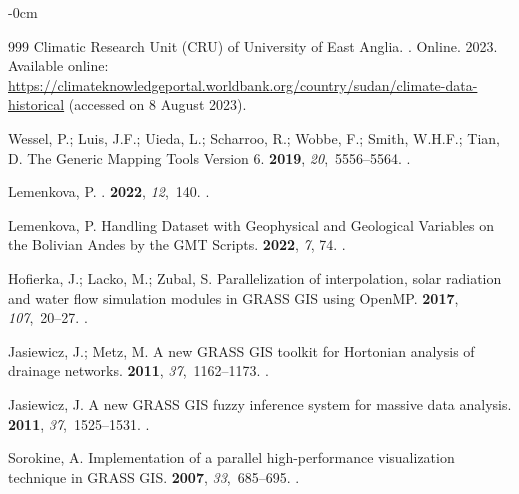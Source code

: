 \documentclass[analytics,article,accept,pdftex,moreauthors]{Definitions/mdpi}
\begin{document}
\begin{adjustwidth}{-\extralength}{0cm}
\begin{thebibliography}{999}
{Climatic Research Unit (CRU) of University of East Anglia}.
.
\newblock Online.  2023.
\newblock
  Available online: \url{https://climateknowledgeportal.worldbank.org/country/sudan/climate-data-historical} (accessed on 8 August 2023).

Wessel, P.; Luis, J.F.; Uieda, L.; Scharroo, R.; Wobbe, F.; Smith, W.H.F.;
  Tian, D.
\newblock The Generic Mapping Tools Version 6.
 {\bf 2019}, {\em
  20},~5556--5564.
.

Lemenkova, P.
.
 {\bf 2022}, {\em 12},~140.
.

Lemenkova, P.
\newblock Handling Dataset with Geophysical and Geological Variables on the
  Bolivian Andes by the GMT Scripts.
 {\bf 2022}, {\em 7}, 74.
.

Hofierka, J.; Lacko, M.; Zubal, S.
\newblock Parallelization of interpolation, solar radiation and water flow
  simulation modules in GRASS GIS using OpenMP.
 {\bf 2017}, {\em 107},~20--27.
.

Jasiewicz, J.; Metz, M.
\newblock A new GRASS GIS toolkit for Hortonian analysis of drainage networks.
 {\bf 2011}, {\em 37},~1162--1173.
.

Jasiewicz, J.
\newblock A new GRASS GIS fuzzy inference system for massive data analysis.
 {\bf 2011}, {\em 37},~1525--1531.
.

Sorokine, A.
\newblock Implementation of a parallel high-performance visualization technique
  in GRASS GIS.
 {\bf 2007}, {\em 33},~685--695.
.


\end{thebibliography}
\end{adjustwidth}
\end{document}
